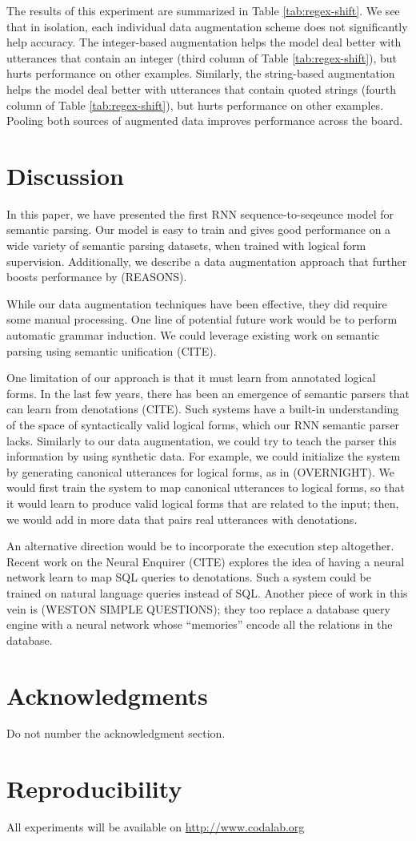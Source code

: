 \documentclass[11pt,letterpaper]{article}
\begin{document}
The results of this experiment are summarized in Table \ref{tab:regex-shift}.
We see that in isolation, each individual data augmentation scheme
does not significantly help accuracy.
The integer-based augmentation helps the model deal better
with utterances that contain an integer 
(third column of Table \ref{tab:regex-shift}),
but hurts performance on other examples.
Similarly, the string-based augmentation helps the model
deal better with utterances that contain quoted strings 
(fourth column of Table \ref{tab:regex-shift}),
but hurts performance on other examples.
Pooling both sources of augmented data improves performance
across the board.

\section{Discussion}
In this paper, we have presented the first RNN sequence-to-seqeunce
model for semantic parsing.  Our model is easy to train
and gives good performance on a wide variety of semantic parsing
datasets, when trained with logical form supervision.
Additionally, we describe a data augmentation approach that 
further boosts performance by (REASONS).

While our data augmentation techniques have been effective,
they did require some manual processing.
One line of potential future work would be to
perform automatic grammar induction.
We could leverage existing work on semantic parsing
using semantic unification (CITE).

One limitation of our approach is that it must learn from annotated logical forms.
In the last few years, there has been an emergence of
semantic parsers that can learn from denotations (CITE).
Such systems have a built-in understanding of the space of
syntactically valid logical forms, which our RNN semantic parser lacks.
Similarly to our data augmentation, we could try to
teach the parser this information by using synthetic data.
For example, we could initialize the system 
by generating canonical utterances for logical forms,
as in (OVERNIGHT).  We would first train the system to map
canonical utterances to logical forms, so that it would learn to produce
valid logical forms that are related to the input;
then, we would add in more data that pairs real utterances with denotations.

An alternative direction would be to incorporate the execution
step altogether.  Recent work on the Neural Enquirer (CITE)
explores the idea of having a neural network learn to map
SQL queries to denotations.  Such a system could be trained
on natural language queries instead of SQL.
Another piece of work in this vein is (WESTON SIMPLE QUESTIONS);
they too replace a database query engine with a neural network
whose ``memories'' encode all the relations in the database.

\section*{Acknowledgments}
Do not number the acknowledgment section.

\section*{Reproducibility}
All experiments will be available on 
\url{http://www.codalab.org}



\end{document}
